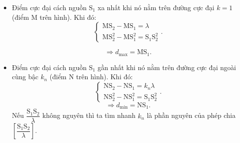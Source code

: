 \begin{itemize}
	\item Điểm cực đại cách nguồn $\text{S}_1$ xa nhất khi nó nằm trên đường cực đại $k = 1$ (điểm M trên hình). Khi đó:
	\begin{equation*}
		\begin{cases}
			\text{MS}_2 - \text{MS}_1 =\lambda \\
			\text{MS}_2^2 - \text{MS}_1^2=\text{S}_1\text{S}_2^2
		\end{cases}.
	\end{equation*}
	
	
	\begin{equation*}
		\Rightarrow d_{\text{max}}=\text{MS}_1.
	\end{equation*}
	\item  Điểm cực đại cách nguồn $\text{S}_1$ gần nhất khi nó nằm trên đường cực đại ngoài cùng bậc $k_n$ (điểm N trên hình). Khi đó:
	\begin{equation*}
		\begin{cases}
			\text{NS}_2 - \text{NS}_1 =k_n\lambda \\
			\text{NS}_2^2 - \text{NS}_1^2=\text{S}_1\text{S}_2^2
		\end{cases}.
	\end{equation*}
	\begin{equation*}
		\Rightarrow d_{\text{min}}=\text{NS}_1.
	\end{equation*}
	Nếu $\dfrac{\text{S}_1\text{S}_2}{\lambda}$ không nguyên thì ta tìm nhanh $k_n$ là phần nguyên của phép chia  $\left[\dfrac{\text{S}_1\text{S}_2}{\lambda}\right]$.
\end{itemize}


